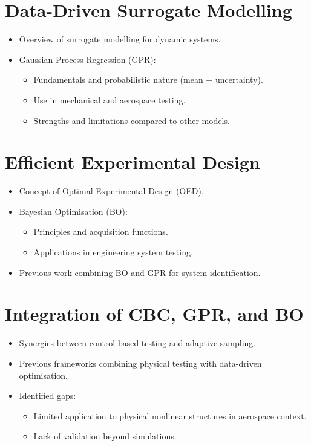 \section{Data-Driven Surrogate Modelling}
\begin{itemize}
    \item Overview of surrogate modelling for dynamic systems.
    \item Gaussian Process Regression (GPR):
    \begin{itemize}
        \item Fundamentals and probabilistic nature (mean + uncertainty).
        \item Use in mechanical and aerospace testing.
        \item Strengths and limitations compared to other models.
    \end{itemize}
\end{itemize}

\section{Efficient Experimental Design}
\begin{itemize}
    \item Concept of Optimal Experimental Design (OED).
    \item Bayesian Optimisation (BO):
    \begin{itemize}
        \item Principles and acquisition functions.
        \item Applications in engineering system testing.
    \end{itemize}
    \item Previous work combining BO and GPR for system identification.
\end{itemize}

\section{Integration of CBC, GPR, and BO}
\begin{itemize}
    \item Synergies between control-based testing and adaptive sampling.
    \item Previous frameworks combining physical testing with data-driven optimisation.
    \item Identified gaps:
    \begin{itemize}
        \item Limited application to physical nonlinear structures in aerospace context.
        \item Lack of validation beyond simulations.
    \end{itemize}
\end{itemize}

